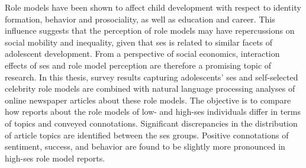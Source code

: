Role models have been shown to affect child development with respect to identity formation, behavior and prosociality, as well as education and career. 
This influence suggests that the perception of role models may have repercussions on social mobility and inequality, given that \gls{ses} is related to similar facets of adolescent development.
From a perspective of social economics, interaction effects of \gls{ses} and role model perception are therefore a promising topic of research.
In this thesis, survey results capturing adolescents' \gls{ses} and self-selected celebrity role models are combined with natural language processing analyses of online newspaper articles about these role models.
The objective is to compare how reports about the role models of low- and high-\gls{ses} individuals differ in terms of topics and conveyed connotations.
Significant discrepancies in the distribution of article topics are identified between the \gls{ses} groups. Positive connotations of sentiment, success, and behavior are found to be slightly more pronounced in high-\gls{ses} role model reports.


\glsresetall